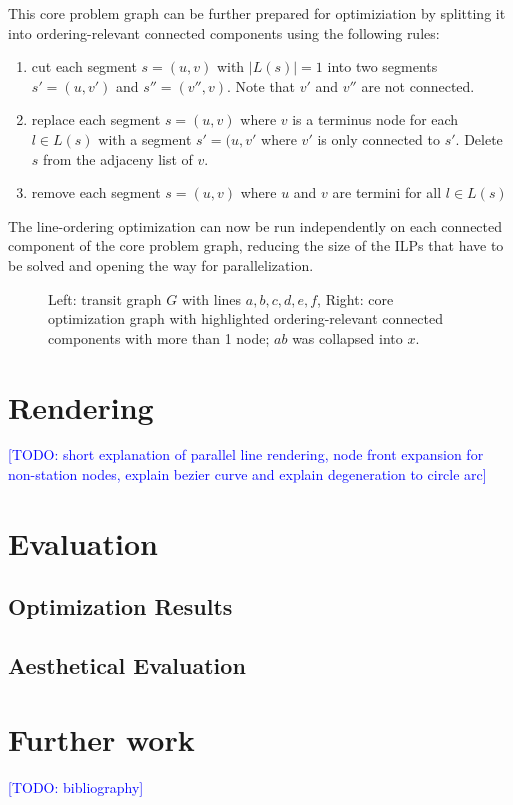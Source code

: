 \documentclass{llncs}
\newcommand\todo[1]{\textcolor{blue}{[TODO: #1]}}
\begin{document}
This core problem graph can be further prepared for optimiziation by splitting it into ordering-relevant connected components using the following rules:
\begin{enumerate}
	\item cut each segment $s = (u, v)$ with $|L(s)| = 1$ into two segments $s' = (u, v')$ and $s'' = (v'', v)$. Note that $v'$ and $v''$ are not connected.
	\item replace each segment $s = (u, v)$ where $v$ is a terminus node for each $l \in L(s)$ with a segment $s' = (u, v'$ where $v'$ is only connected to $s'$. Delete $s$ from the adjaceny list of $v$.
	\item remove each segment $s = (u, v)$ where $u$ and $v$ are termini for all $l \in L(s)$
\end{enumerate}
The line-ordering optimization can now be run independently on each connected component of the core problem graph, reducing the size of the ILPs that have to be solved and opening the way for parallelization.
\begin{figure}[h]
\centering
	
	\hspace{0.6cm}
	
	\caption{Left: transit graph $G$ with lines $a, b, c, d, e, f$, Right: core optimization graph with highlighted ordering-relevant connected components with more than 1 node; $ab$ was collapsed into $x$.}
\end{figure}

%
\section{Rendering}\label{SEC:rendering}
%
\todo{short explanation of parallel line rendering, node front expansion for non-station nodes, explain bezier curve and explain degeneration to circle arc}

%
\section{Evaluation}
%

%
\subsection{Optimization Results}
%

%
\subsection{Aesthetical Evaluation}
%

%
\section{Further work}
%

\todo{bibliography}
\end{document}
